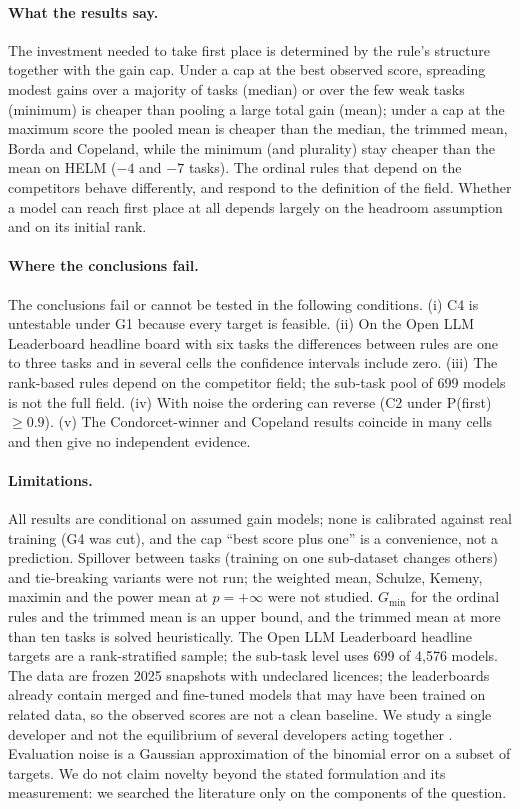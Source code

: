 \documentclass{article}
\begin{document}
\paragraph{What the results say.} The investment needed to take first place is determined by the rule's structure together with the gain cap. Under a cap at the best observed score, spreading modest gains over a majority of tasks (median) or over the few weak tasks (minimum) is cheaper than pooling a large total gain (mean); under a cap at the maximum score the pooled mean is cheaper than the median, the trimmed mean, Borda and Copeland, while the minimum (and plurality) stay cheaper than the mean on HELM ($-4$ and $-7$ tasks). The ordinal rules that depend on the competitors behave differently, and respond to the definition of the field. Whether a model can reach first place at all depends largely on the headroom assumption and on its initial rank.
\paragraph{Where the conclusions fail.} The conclusions fail or cannot be tested in the following conditions. (i) C4 is untestable under G1 because every target is feasible. (ii) On the Open LLM Leaderboard headline board with six tasks the differences between rules are one to three tasks and in several cells the confidence intervals include zero. (iii) The rank-based rules depend on the competitor field; the sub-task pool of 699 models is not the full field. (iv) With noise the ordering can reverse (C2 under P(first) $\ge0.9$). (v) The Condorcet-winner and Copeland results coincide in many cells and then give no independent evidence.
\paragraph{Limitations.} All results are conditional on assumed gain models; none is calibrated against real training (G4 was cut), and the cap ``best score plus one'' is a convenience, not a prediction. Spillover between tasks (training on one sub-dataset changes others) and tie-breaking variants were not run; the weighted mean, Schulze, Kemeny, maximin and the power mean at $p=+\infty$ were not studied. $G_{\min}$ for the ordinal rules and the trimmed mean is an upper bound, and the trimmed mean at more than ten tasks is solved heuristically. The Open LLM Leaderboard headline targets are a rank-stratified sample; the sub-task level uses 699 of 4{,}576 models. The data are frozen 2025 snapshots with undeclared licences; the leaderboards already contain merged and fine-tuned models that may have been trained on related data, so the observed scores are not a clean baseline. We study a single developer and not the equilibrium of several developers acting together \citep{chen2026incentives}. Evaluation noise is a Gaussian approximation of the binomial error on a subset of targets. We do not claim novelty beyond the stated formulation and its measurement: we searched the literature only on the components of the question.
\end{document}
